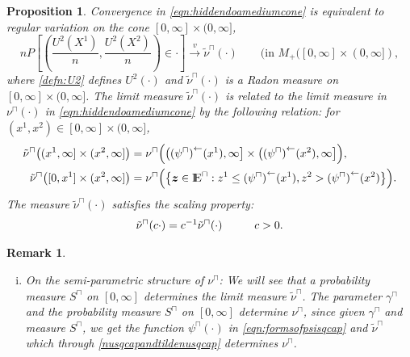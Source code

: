 \documentclass[11 pt]{amsart}
\newtheorem{prop}[thm]{Proposition}
\newtheorem{rem}[thm]{Remark}
\numberwithin{equation}{section}
\begin{document}
{{\begin{prop}\label{prop:nonstanequihrv}
{{Convergence in \eqref{eqn:hiddendoamediumcone} is equivalent to
    {regular variation on the cone $[0, \infty] \times (0, \infty]$},
\begin{equation}\label{nonstanequihrv}
nP\left[ \left( \frac{U^2(X^1)}{n}, \frac{U^2(X^2)}{n} \right) \in
  \cdot \right] \stackrel{v}{\rightarrow} \tilde \nu^{\sqcap}(\cdot)
\qquad (\text{in }M_+([0, \infty] \times (0, \infty]),
\end{equation}
 where \eqref{defn:U2} defines $U^2(\cdot)$  and $\tilde
 \nu^{\sqcap}(\cdot)$ is a Radon measure on $[0, \infty] \times (0,
 \infty]$. The limit measure $\tilde \nu^{\sqcap}(\cdot)$ is related
 to the limit measure in $\nu^{\sqcap}(\cdot)$ in
 \eqref{eqn:hiddendoamediumcone} by the following relation: for $(x^1,
 x^2) \in [0, \infty] \times (0, \infty]$,  
\begin{align}\label{nusqcapandtildenusqcap}
\tilde \nu^{\sqcap}\bigl((x^1, \infty] \times (x^2, \infty]\bigr) &=
\nu^{\sqcap} \Bigl( \bigl({(\psi^{\sqcap} )}^{\leftarrow}(x^1), \infty
\bigr] \times \bigl({(\psi^{\sqcap})}^{\leftarrow}(x^2), \infty \bigr]
\Bigr),\nonumber\\ 
\tilde \nu^{\sqcap} \bigl([0, x^1] \times (x^2, \infty]\bigr) &=
\nu^{\sqcap} \Bigl( \left\{ {\boldsymbol z} \in {\mathop{\rm I\kern -0.20em E}\nolimits}^{\sqcap}: z^1 \le
  {\left(\psi^{\sqcap}\right)}^{\leftarrow}(x^1), z^2 >
  {\left(\psi^{\sqcap}\right)}^{\leftarrow}(x^2) \right\} \Bigr). 
\end{align}
The measure $\tilde \nu^{\sqcap}(\cdot)$ satisfies the scaling property:
\begin{align}\label{scaling_nusqcaptilde}
\tilde \nu^{\sqcap}(c \cdot) = c^{-1} \tilde \nu^{\sqcap}( \cdot) \hskip 1 cm c > 0.
\end{align}
}}
\end{prop}

\begin{rem}
{\rm{ 
\begin{enumerate}[(i)]
\item 
On the semi-parametric structure of $\nu^{\sqcap}$:
We will see that a probability measure $S^{\sqcap}$
  on $[0, \infty]$ determines the limit measure $\tilde
  \nu^{\sqcap}$.
The
  parameter $\gamma^{\sqcap}$ and the probability measure $S^{\sqcap}$
  on $[0, \infty]$  determine $\nu^{\sqcap}$, since
given $\gamma^{\sqcap}$ and 
  measure $S^{\sqcap}$, we get 
 the function
  $\psi^{\sqcap}(\cdot)$  in \eqref{eqn:formsofpsisqcap} 
and $\tilde
  \nu^{\sqcap}$ which through
\eqref{nusqcapandtildenusqcap} determines $\nu^{\sqcap}$.


\end{enumerate}}}
\end{rem}}}
\end{document}
